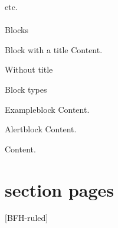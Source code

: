\documentclass[
    ngerman,%
    authorontitle=true,
]{bfhbeamer}
\begin{document}
    \begin{frame}{etc.}
        \framesubtitle{}
    \end{frame}

    \begin{frame}{Blocks}
        \begin{block}{Block with a title}
            Content.
        \end{block}
        \begin{block}{}
            Without title
        \end{block}
    \end{frame}

    \begin{frame}{Block types}
        \begin{exampleblock}{Exampleblock}
            Content.
        \end{exampleblock}
        \begin{alertblock}{Alertblock}
            Content.
        \end{alertblock}
        \begin{example}
            Content.
        \end{example}
    \end{frame}

    \section{section pages}

    [BFH-ruled]
    \frame{\sectionpage}





\end{document}
